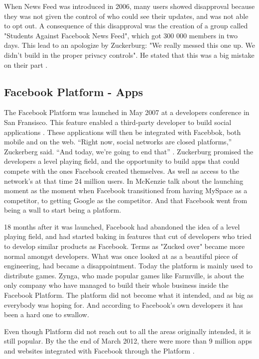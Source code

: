 When News Feed was introduced in 2006, many users showed disapproval because they was not given the control of who could see their updates, and was not able to opt out. A consequence of this disapproval was the creation of a group called "Students Against Facebook News Feed", which got 300 000 members in two days. This lead to an apologize by Zuckerburg: "We really messed this one up. We didn't build in the proper privacy controls". He stated that this was a big mistake on their part \cite{newsfeed2}. 


\subsection{Facebook Platform - Apps}
\label{subsec:app}
The Facebook Platform was launched in May 2007 at a developers conference in San Fransisco. This feature enabled a third-party developer to build social applications \cite{BBCFacebookGrowth}. These applications will then be integrated with Facebbok, both mobile and on the web. “Right now, social networks are closed platforms,” Zuckerberg said. “And today, we’re going to end that” \cite{platformStory}. Zuckerburg promised the developers a level playing field, and the opportunity to build apps that could compete with the ones Facebook created themselves. As well as access to the network's at that time 24 million users. In \cite{platformStory} McKenzie talk about the launching moment as the moment when Facebook transitioned from having MySpace as a competitor, to getting Google as the competitor. And that Facebook went from being a wall to start being a platform. 

18 months after it was launched, Facebook had abandoned the idea of a level playing field, and had started baking in features that cut of developers who tried to develop similar products as Facebook. Terms as "Zucked over" became more normal amongst developers. What was once looked at as a beautiful piece of engineering, had became a disappointment. Today the platform is mainly used to distribute games. Zynga, who made popular games like Farmville, is about the only company who have managed to build their whole business inside the Facebook Platform. The platform did not become what it intended, and as big as everybody was hoping for. And according to Facebook's own developers it has been a hard one to swallow. 

Even though Platform did not reach out to all the areas originally intended, it is still popular. By the the end of March 2012, there were more than 9 million apps and websites integrated with Facebook through the Platform \cite{fbPlatform}.

